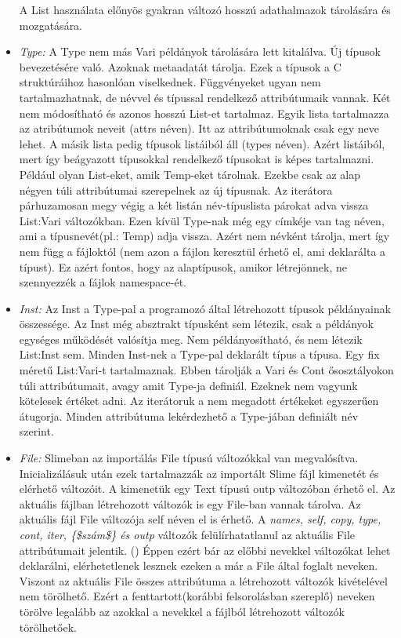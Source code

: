 \begin{itemize}
A List használata előnyös gyakran változó hosszú adathalmazok tárolására és mozgatására.
\item \emph{Type:} 
A Type nem más Vari példányok tárolására lett kitalálva.
Új típusok bevezetésére való.
Azoknak metaadatát tárolja.
Ezek a típusok a C struktúráihoz hasonlóan viselkednek.
Függvényeket ugyan nem tartalmazhatnak, de névvel és típussal rendelkező attribútumaik vannak.
Két nem módosítható és azonos hosszú List-et tartalmaz.
Egyik lista tartalmazza az atribútumok neveit (attrs néven).
Itt az attribútumoknak csak egy neve lehet.
A másik lista pedig típusok listáiból áll (types néven).
Azért listáiból, mert így beágyazott típusokkal rendelkező típusokat is képes tartalmazni. 
Például olyan List-eket, amik Temp-eket tárolnak.
Ezekbe csak az alap négyen túli attribútumai szerepelnek az új típusnak.
Az iterátora párhuzamosan megy végig a két listán név-típuslista párokat adva vissza List:Vari változókban.
Ezen kívül Type-nak még egy címkéje van tag néven, ami a típusnevét(pl.: Temp) adja vissza.
Azért nem névként tárolja, mert így nem függ a fájloktól (nem azon a fájlon keresztül érhető el, ami deklarálta a típust).
Ez azért fontos, hogy az alaptípusok, amikor létrejönnek, ne szennyezzék a fájlok namespace-ét.
\item \emph{Inst:} 
Az Inst a Type-pal a programozó által létrehozott típusok példányainak összessége.
Az Inst még absztrakt típusként sem létezik, csak a példányok egységes működését valósítja meg.
Nem példányosítható, és nem létezik List:Inst sem.
Minden Inst-nek a Type-pal deklarált típus a típusa.
Egy fix méretű List:Vari-t tartalmaznak.
Ebben tárolják a Vari és Cont ősosztályokon túli attribútumait, avagy amit Type-ja definiál.
Ezeknek nem vagyunk kötelesek értéket adni.
Az iterátoruk a nem megadott értékeket egyszerűen átugorja.
Minden attribútuma lekérdezhető a Type-jában definiált név szerint.
\item \emph{File:} 
Slimeban az importálás File típusú változókkal van megvalósítva.
Inicializálásuk után ezek tartalmazzák az importált Slime fájl kimenetét és elérhető változóit.
A kimenetük egy Text típusú outp változóban érhető el.
Az aktuális fájlban létrehozott változók is egy File-ban vannak tárolva.
Az aktuális fájl File változója self néven el is érhető.
A \textit{names, self, copy, type, cont, iter, \{\$szám\$\} és outp} változók felülírhatatlanul az aktuális File attribútumait jelentik.
()
Éppen ezért bár az előbbi nevekkel változókat lehet deklarálni, elérhetetlenek lesznek ezeken a már a File által foglalt neveken. 
Viszont az aktuális File összes attribútuma a létrehozott változók kivételével nem törölhető.
Ezért a fenttartott(korábbi felsorolásban szereplő) neveken törölve legalább az azokkal a nevekkel a fájlból létrehozott változók törölhetőek.
\end{itemize}



